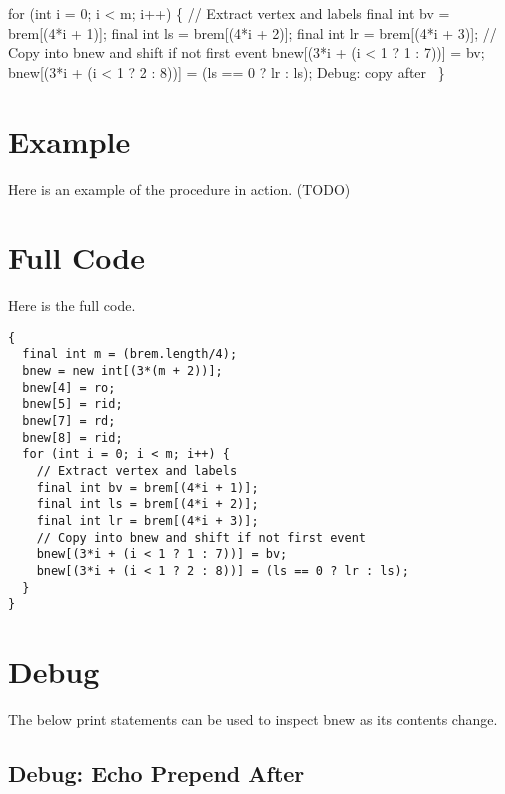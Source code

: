 \nwenddocs{}\endmoddef\nwstartdeflinemarkup{}\nwenddeflinemarkup
for (int i = 0; i < m; i++) \{
  // Extract vertex and labels
  final int bv = brem[(4*i + 1)];
  final int ls = brem[(4*i + 2)];
  final int lr = brem[(4*i + 3)];
  // Copy into bnew and shift if not first event
  bnew[(3*i + (i < 1 ? 1 : 7))] = bv;
  bnew[(3*i + (i < 1 ? 2 : 8))] = (ls == 0 ? lr : ls);
  \LA{}Debug: copy after~{\nwtagstyle{}}\RA{}
\}
\nwendcode{}\nwdocspar

\section{Example}

Here is an example of the procedure in action. (TODO)

\section{Full Code}

Here is the full code.

\begin{verbatim}
{
  final int m = (brem.length/4);
  bnew = new int[(3*(m + 2))];
  bnew[4] = ro;
  bnew[5] = rid;
  bnew[7] = rd;
  bnew[8] = rid;
  for (int i = 0; i < m; i++) {
    // Extract vertex and labels
    final int bv = brem[(4*i + 1)];
    final int ls = brem[(4*i + 2)];
    final int lr = brem[(4*i + 3)];
    // Copy into bnew and shift if not first event
    bnew[(3*i + (i < 1 ? 1 : 7))] = bv;
    bnew[(3*i + (i < 1 ? 2 : 8))] = (ls == 0 ? lr : ls);
  }
}
\end{verbatim}

\section{Debug}

The below print statements can be used to inspect {\Tt{}bnew\nwendquote} as its contents
change.

\subsection{Debug: Echo Prepend After}

